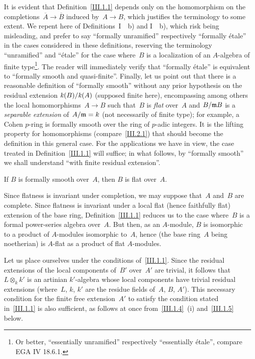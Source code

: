 \begin{remarks}
\label{III.1.2}
It is evident that Definition~\ref{III.1.1} depends only on the homomorphism on the completions~$\overline{A}\to\overline{B}$ induced by~$A\to B$, which justifies the terminology to some extent. We repent here of Definitions~I~~b) and I~~b), which risk being misleading, and prefer to say ``formally unramified'' respectively ``formally étale'' in the cases considered in these definitions, reserving the terminology ``unramified'' and ``étale'' for the case where~$B$ is a localization of an $A$-algebra of finite type\footnote{Or better, ``essentially unramified'' respectively ``essentially étale'', compare EGA IV 18.6.1.}. The reader will immediately verify that ``formally étale'' is equivalent to ``formally smooth and quasi-finite''. Finally, let us point out that there is a reasonable definition of ``formally smooth'' without any prior hypothesis on the residual extension
$\mathit{k}(B)/\mathit{k}(A)$ (supposed finite here), encompassing among others the local homomorphisms~$A\to B$ such that~$B$ is \emph{flat} over~$A$ and $B/\mathfrak{m}B$ is a \emph{separable extension} of~$A/\mathfrak{m}=k$ (not necessarily of finite type); for example, a Cohen $p$-ring is formally smooth over the ring of $p$-adic integers. It is the lifting property for homomorphisms (compare~\ref{III.2.1}) that should become the definition in this general case. For the applications we have in view, the case treated in Definition~\ref{III.1.1} will suffice; in what follows, by ``formally smooth'' we shall understand ``with finite residual extension''.
\end{remarks}

\begin{lemma}
\label{III.1.3}
If $B$ is formally smooth over~$A$, then $B$ is flat over~$A$.
\end{lemma}

Since flatness is invariant under completion, we may suppose that~$A$ and~$B$ are complete. Since flatness is invariant under a local flat (hence faithfully flat) extension of the base ring, Definition~\ref{III.1.1} reduces us to the case where~$B$ is a formal power-series algebra over~$A$. But then, as an $A$-module, $B$ is isomorphic to a product of $A$-modules isomorphic to~$A$, hence (the base ring~$A$ being noetherian) is $A$-flat as a product of flat $A$-modules.

\medskip
Let us place ourselves under the conditions of~\ref{III.1.1}. Since the residual extensions of the local components of~$B'$ over~$A'$ are trivial, it follows that $L\otimes_k k'$ is an artinian $k'$-algebra whose local components have trivial residual extensions (where~$L$, $k$, $k'$ are the residue fields of~$A$, $B$, $A'$). This necessary condition for the finite free extension~$A'$ to satisfy the condition stated in~\ref{III.1.1} is also sufficient, as follows at once from~\ref{III.1.4}~(i) and~\ref{III.1.5} below.

